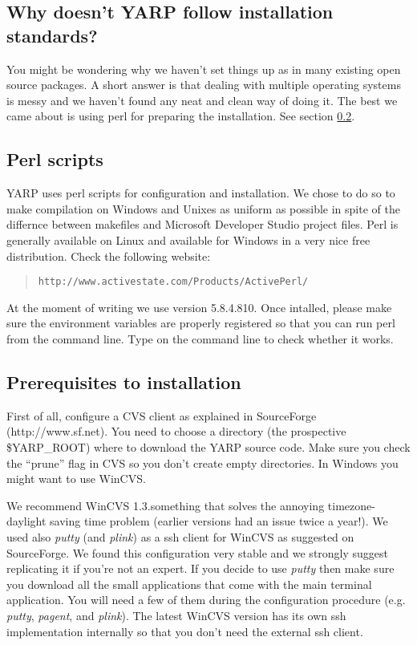 \subsection{Why doesn't YARP follow installation standards?}
You might be wondering why we haven't set things up as in many existing open source packages. A short answer is that dealing with multiple operating systems is messy and we haven't found any neat and clean way of doing it. The best we came about is using perl for preparing the installation. See section \ref{sect:perl}.

\subsection{Perl scripts}
\label{sect:perl}

YARP uses perl scripts for configuration and installation. We chose to do so to make compilation on Windows and Unixes as uniform as possible in spite of the differnce between makefiles and Microsoft Developer Studio project files. Perl is generally available on Linux and available for Windows in a very nice free distribution. Check the following website:

\begin{quote}
{\tt http://www.activestate.com/Products/ActivePerl/}
\end{quote}

At the moment of writing we use version 5.8.4.810. Once intalled, please make sure the environment variables are properly registered so that you can run perl from the command line.
Type  on the command line to check whether it works.

\subsection{Prerequisites to installation}

First of all, configure a CVS client as explained in SourceForge (http://www.sf.net).
You need to choose a directory (the prospective \$YARP\_ROOT) where to download the
YARP source code. Make sure you check the ``prune'' flag in CVS so you don't create
empty directories. In Windows you might want to use WinCVS.

We recommend WinCVS 1.3.something that solves the annoying timezone-daylight saving time
problem (earlier versions had an issue twice a year!). We used also {\em putty} (and {\em plink}) as a ssh client for WinCVS as suggested on SourceForge. We found this configuration very stable and we strongly suggest replicating it if you're not an expert. 
If you decide to use {\em putty} then make sure you download all the small applications that come with the main terminal application. You will need a few of them during the configuration procedure (e.g. {\em putty}, {\em pagent}, and {\em plink}). The latest WinCVS version has its own ssh implementation internally so that you don't need the external ssh client.

